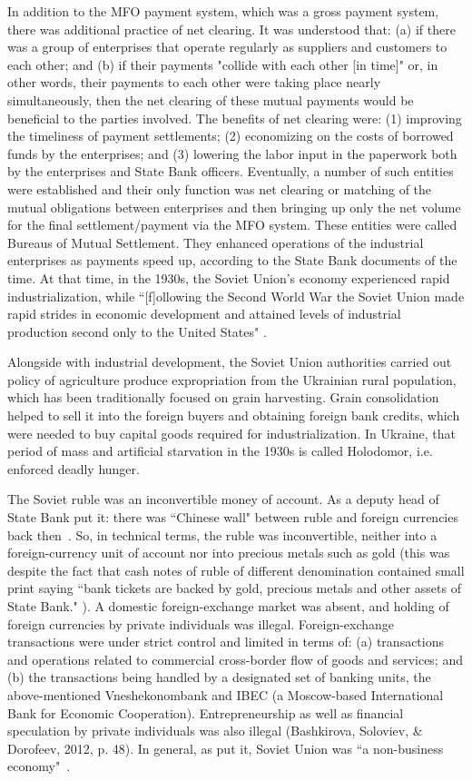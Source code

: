In addition to the MFO payment system, which was a gross payment system,
there was additional practice of net clearing. It was understood that:
(a) if there was a group of enterprises that operate regularly as
suppliers and customers to each other; and (b) if their payments
"collide with each other [in time]" or, in other words, their payments
to each other were taking place nearly simultaneously, then the net
clearing of these mutual payments would be beneficial to the parties
involved. The benefits of net clearing were: (1) improving the
timeliness of payment settlements; (2) economizing on the costs of
borrowed funds by the enterprises; and (3) lowering the labor input in
the paperwork both by the enterprises and State Bank officers.
Eventually, a number of such entities were established and their only
function was net clearing or matching of the mutual obligations between
enterprises and then bringing up only the net volume for the final
settlement/payment via the MFO system. These entities were called
Bureaus of Mutual Settlement. They enhanced operations of the industrial
enterprises as payments speed up, according to the State Bank documents
of the time. At that time, in the 1930s, the Soviet Union's economy
experienced rapid industrialization, while ``[f]ollowing the Second World
War the Soviet Union made rapid strides in economic development and
attained levels of industrial production second only to the United
States" \citep[p.~612]{dillard2}.

Alongside with industrial development, the Soviet Union authorities
carried out policy of agriculture produce expropriation from the
Ukrainian rural population, which has been traditionally focused on
grain harvesting. Grain consolidation helped to sell it into the foreign
buyers and obtaining foreign bank credits, which were needed to buy
capital goods required for industrialization. In Ukraine, that period of
mass and artificial starvation in the 1930s is called Holodomor, i.e.
enforced deadly hunger.

The Soviet ruble was an inconvertible money of account. As a deputy
head of State Bank put it: there was ``Chinese wall" between ruble and
foreign currencies back then~\citep[p.~19]{krotov2008b}. So, in technical
terms, the ruble was inconvertible, neither into a foreign-currency unit
of account nor into precious metals such as gold (this was despite the
fact that cash notes of ruble of different denomination contained small
print saying ``bank tickets are backed by gold, precious metals and other
assets of State Bank." ). A domestic foreign-exchange market was absent,
and holding of foreign currencies by private individuals was illegal.
Foreign-exchange transactions were under strict control and limited in
terms of: (a) transactions and operations related to commercial
cross-border flow of goods and services; and (b) the transactions being
handled by a designated set of banking units, the above-mentioned
Vneshekonombank and IBEC (a Moscow-based International Bank for Economic
Cooperation). Entrepreneurship as well as financial speculation by
private individuals was also illegal (Bashkirova, Soloviev, \& Dorofeev,
2012, p. 48). In general, as \citeauthor{dillard2} put it, Soviet Union was ``a non-business economy"~\citep[p.~633]{dillard2}.

